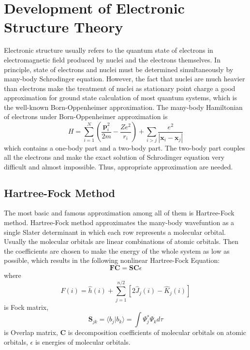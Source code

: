 \chapter{Development of Electronic Structure Theory}
Electronic structure usually refers to the quantum state of electrons in electromagnetic field produced by nuclei and the electrons themselves.\cite{elecstruc}
In principle, state of electrons and nuclei must be determined simultaneously by many-body Schrodinger equation.
However, the fact that nuclei are much heavier than electrons make the treatment of nuclei as stationary point charge a good approximation for ground state calculation of most quantum systems, which is the well-known Born-Oppenheimer approximation.\cite{sakurai}
The many-body Hamiltonian of electrons under Born-Oppenheimer approximation is
\begin{equation}
H=\sum_{i=1}^{N}\left(\frac{\boldsymbol{p}_{i}^{2}}{2 m}-\frac{Z e^{2}}{r_{i}}\right)+\sum_{i>j} \frac{e^{2}}{|\boldsymbol{x}_{i}-\boldsymbol{x}_{j}|}
\end{equation}
which contains a one-body part and a two-body part.
The two-body part couples all the electrons and make the exact solution of Schrodinger equation very difficult and almost impossible.
Thus, appropriate approximation are needed.


\section{Hartree-Fock Method}
The most basic and famous approximation among all of them is Hartree-Fock method.\cite{hartree}
Hartree-Fock method approximates the many-body wavefuntion as a single Slater determinant in which each row represents a molecular orbital. 
Usually the molecular orbitals are linear combinations of atomic orbitals. 
Then the coefficients are chosen to make the energy of the whole system as low as possible, which results in the following nonlinear Hartree-Fock Equation:
\begin{equation}
\mathbf{F} \mathbf{C}=\mathbf{S} \mathbf{C} \epsilon
\end{equation}
where
\begin{equation}
\hat{F}(i)=\hat{h}(i)+\sum_{j=1}^{n / 2}\left[2 \hat{J}_{j}(i)-\hat{K}_{j}(i)\right]
\end{equation}
is Fock matrix, 
\begin{equation}
\mathbf{S}_{j k}=\langle b_{j} | b_{k}\rangle=\int \Psi_{j}^{*} \Psi_{k} d \tau
\end{equation}
is Overlap matrix,
$\mathbf{C}$ is decomposition coefficients of molecular orbitals on atomic orbitals,
$\epsilon$ is energies of molecular orbitals.

